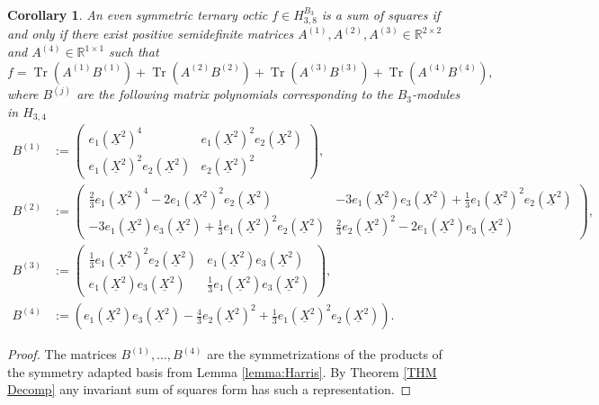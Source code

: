 \documentclass[11pt,a4paper]{amsart}
\numberwithin{equation}{section}
\newtheorem{cor}[thm]{Corollary}
\theoremstyle{definition}
\newcommand{\R}{\mathbb{R}}
\DeclareMathOperator{\Tr}{Tr}
\numberwithin{thm}{section}
\theoremstyle{break}
\numberwithin{subcase}{case}
\begin{document}
\begin{cor}\label{cor:ternaryOcticsSOSDec}
An even symmetric ternary octic $f \in H_{3,8}^{B_3}$ is a sum of squares if and only if there exist positive semidefinite matrices $A^{(1)},A^{(2)},A^{(3)} \in \R^{2 \times 2}$ and $A^{(4)} \in \R^{1 \times 1}$ such that $$f = \Tr \left( A^{(1)} B^{(1)} \right) +  \Tr \left( A^{(2)} B^{(2)} \right) + \Tr \left( A^{(3)} B^{(3)} \right) + \Tr \left( A^{(4)} B^{(4)} \right),$$ where $B^{(j)}$ are the following matrix polynomials corresponding to the $B_3$-modules in $H_{3,4}$ \begin{align*}
    B^{(1)} & := \left( \begin{array}{cc}
e_1(\underline{X}^2)^4     & e_1(\underline{X}^2)^2e_2(\underline{X}^2) \\
e_1(\underline{X}^2)^2e_2(\underline{X}^2)     & e_2(\underline{X}^2)^2
\end{array} \right), \\ 
B^{(2)} & := \left( \begin{array}{cc}
\frac{2}{3}e_1(\underline{X}^2)^4-2e_1(\underline{X}^2)^2e_2(\underline{X}^2)     &  -3e_1(\underline{X}^2)e_3(\underline{X}^2)+\frac{1}{3}e_1(\underline{X}^2)^2e_2(\underline{X}^2)\\
  -3e_1(\underline{X}^2)e_3(\underline{X}^2)+\frac{1}{3}e_1(\underline{X}^2)^2e_2(\underline{X}^2)  & \frac{2}{3}e_2(\underline{X}^2)^2-2e_1(\underline{X}^2)e_3(\underline{X}^2)
\end{array} \right),  \\
B^{(3)} & := \left( \begin{array}{cc}
\frac{1}{3}e_1(\underline{X}^2)^2e_2(\underline{X}^2)     & e_1(\underline{X}^2)e_3(\underline{X}^2)  \\
e_1(\underline{X}^2)e_3(\underline{X}^2)     &  \frac{1}{3}e_1(\underline{X}^2)e_3(\underline{X}^2)
\end{array}\right),  \\ 
B^{(4)} & := \left( e_1(\underline{X}^2)e_3(\underline{X}^2)-\frac{4}{3}e_2(\underline{X}^2)^2+\frac{1}{3}e_1(\underline{X}^2)^2e_2(\underline{X}^2) \right).
\end{align*}
\end{cor}
\begin{proof}
The matrices $B^{(1)},\ldots,B^{(4)}$ are the symmetrizations of the products of the symmetry adapted basis from Lemma \ref{lemma:Harris}. By Theorem \ref{THM Decomp} any invariant sum of squares form has such a representation.
\end{proof}
\end{document}
